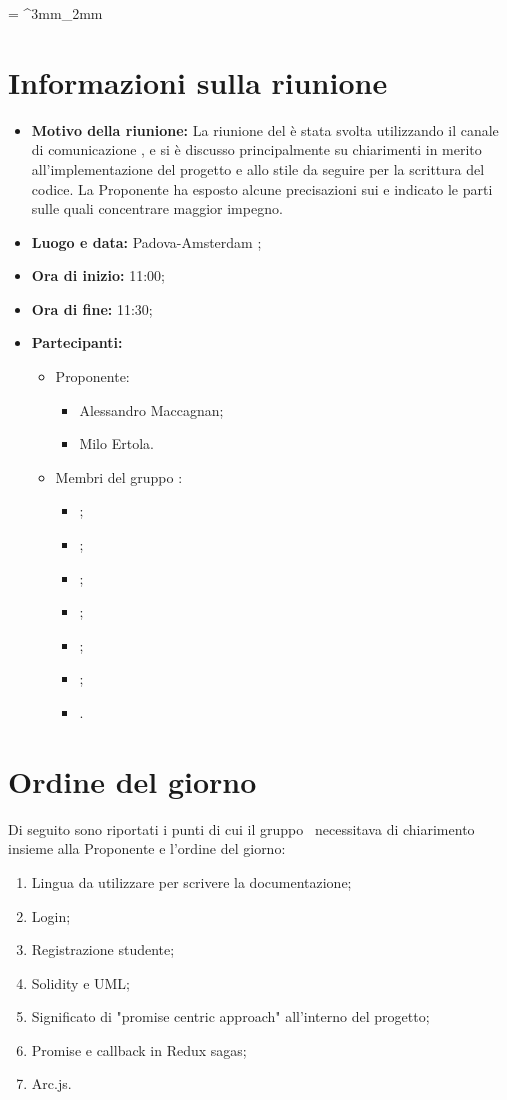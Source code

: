 \documentclass[VER-2017-11-22.tex]{subfiles}
\begin{document}
\tabulinesep = ^3mm_2mm
\chapter{Informazioni sulla riunione} 
\begin{itemize}
	\item \textbf{Motivo della riunione:} La riunione del  è stata svolta utilizzando il canale di comunicazione , e si è discusso principalmente su chiarimenti in merito all'implementazione del progetto e allo stile da seguire per la scrittura del codice. La Proponente ha esposto alcune precisazioni sui  e indicato le parti sulle quali concentrare maggior impegno.
	\item \textbf{Luogo e data:} Padova-Amsterdam ;
	\item \textbf{Ora di inizio:} 11:00;
	\item \textbf{Ora di fine:} 11:30;
	\item \textbf{Partecipanti:}
	\begin{itemize}
	\item Proponente:
		\begin{itemize}
			\item Alessandro Maccagnan;
			\item Milo Ertola.
		\end{itemize}
	\item Membri del gruppo \gruppo:
		\begin{itemize}
			\item \Davide;
			\item \Elena;
			\item \Gianluca;
			\item \Mirco;
			\item \Parwinder;
			\item \Riccardo;
			\item \Valentina.
		\end{itemize}
	\end{itemize}
\end{itemize}

\chapter{Ordine del giorno}
Di seguito sono riportati i punti di cui il gruppo \gruppo\ necessitava di chiarimento insieme alla Proponente e l'ordine del giorno:
\begin{enumerate}
	\item Lingua da utilizzare per scrivere la documentazione;
	\item Login;
	\item Registrazione studente;
	\item Solidity e UML;
	\item Significato di "promise centric approach" all'interno del progetto;
	\item Promise e callback in Redux sagas;
	\item Arc.js.
\end{enumerate}
\end{document}
